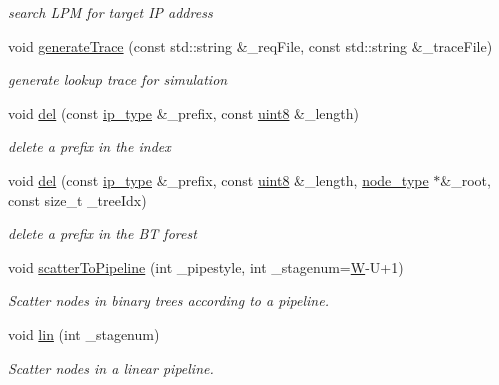 \begin{DoxyCompactItemize}
\begin{DoxyCompactList}\small\item\em search L\-P\-M for target I\-P address \end{DoxyCompactList}\item 
void \hyperlink{classRBTree_a629121f95c14ebfa25a8fba5a7fbfa8f}{generate\-Trace} (const std\-::string \&\-\_\-req\-File, const std\-::string \&\-\_\-trace\-File)
\begin{DoxyCompactList}\small\item\em generate lookup trace for simulation \end{DoxyCompactList}\item 
void \hyperlink{classRBTree_abbaa2510b96ad094e41cc65ac7edc429}{del} (const \hyperlink{classRBTree_ab52ca1695103152fd0b1c2b84a33db8b}{ip\-\_\-type} \&\-\_\-prefix, const \hyperlink{types_8h_a34ecedcf03a70dc91e4616212d79267d}{uint8} \&\-\_\-length)
\begin{DoxyCompactList}\small\item\em delete a prefix in the index \end{DoxyCompactList}\item 
void \hyperlink{classRBTree_a3e233a99d209334de4bdf90741d043a8}{del} (const \hyperlink{classRBTree_ab52ca1695103152fd0b1c2b84a33db8b}{ip\-\_\-type} \&\-\_\-prefix, const \hyperlink{types_8h_a34ecedcf03a70dc91e4616212d79267d}{uint8} \&\-\_\-length, \hyperlink{classRBTree_a34cd65cfffec3d99e0a73deafa471078}{node\-\_\-type} $\ast$\&\-\_\-root, const size\-\_\-t \-\_\-tree\-Idx)
\begin{DoxyCompactList}\small\item\em delete a prefix in the B\-T forest \end{DoxyCompactList}\item 
void \hyperlink{classRBTree_a8a2a446e5293ad414482ab5ce780438a}{scatter\-To\-Pipeline} (int \-\_\-pipestyle, int \-\_\-stagenum=\hyperlink{test__u128_8cpp_ab21b528bc38899d04d3a7053e52fb797}{W}-\/U+1)
\begin{DoxyCompactList}\small\item\em Scatter nodes in binary trees according to a pipeline. \end{DoxyCompactList}\item 
void \hyperlink{classRBTree_ad67f956fe01dd3dbd2cd23e0a287e509}{lin} (int \-\_\-stagenum)
\begin{DoxyCompactList}\small\item\em Scatter nodes in a linear pipeline. \end{DoxyCompactList}\item 

\end{DoxyCompactItemize}
